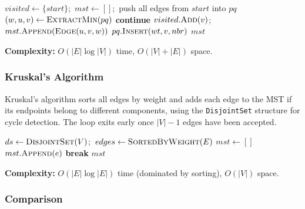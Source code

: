 \documentclass[12pt, a4paper]{article}
\begin{document}
\begin{algorithm}[H]
\caption{Prim's MST}
\begin{algorithmic}[1]
    \State $visited \gets \{start\}$;\ $mst \gets []$;\ push all edges from $start$ into $pq$
        \State $(w, u, v) \gets \textsc{ExtractMin}(pq)$
         \textbf{continue} \EndIf
        \State $visited.\textsc{Add}(v)$;\ $mst.\textsc{Append}(\textsc{Edge}(u,v,w))$
            \State $pq.\textsc{Insert}(wt, v, nbr)$
        \EndFor
    \EndWhile
    \Return $mst$
\EndFunction
\end{algorithmic}
\end{algorithm}

\textbf{Complexity:} $O(|E|\log|V|)$ time, $O(|V|+|E|)$ space.

\subsubsection{Kruskal's Algorithm}

Kruskal's algorithm sorts all edges by weight and adds each edge to the
MST if its endpoints belong to different components, using the
\texttt{DisjointSet} structure for cycle detection. The loop exits early
once $|V|-1$ edges have been accepted.

\begin{algorithm}[H]
\caption{Kruskal's MST}
\begin{algorithmic}[1]
    \State $ds \gets \textsc{DisjointSet}(V)$;\ $edges \gets \textsc{SortedByWeight}(E)$
    \State $mst \gets []$
            \State $mst.\textsc{Append}(e)$
             \textbf{break} \EndIf
        \EndIf
    \EndFor
    \Return $mst$
\EndFunction
\end{algorithmic}
\end{algorithm}

\textbf{Complexity:} $O(|E|\log|E|)$ time (dominated by sorting),
$O(|V|)$ space.

\subsubsection{Comparison}
\end{document}
